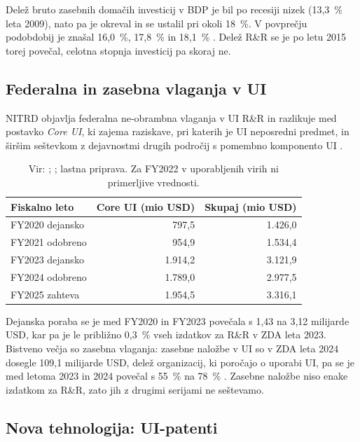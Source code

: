 \documentclass[12pt,a4paper]{article}
\begin{document}
Delež bruto zasebnih domačih investicij v BDP je bil po recesiji nizek (13,3~\% leta 2009), nato pa je okreval in se ustalil pri okoli 18~\%. V povprečju podobdobij je znašal 16,0~\%, 17,8~\% in 18,1~\% \parencite{fredinv}. Delež R\&R se je po letu 2015 torej povečal, celotna stopnja investicij pa skoraj ne.

\subsection{Federalna in zasebna vlaganja v UI}

NITRD objavlja federalna ne-obrambna vlaganja v UI R\&R in razlikuje med postavko \emph{Core UI}, ki zajema raziskave, pri katerih je UI neposredni predmet, in širšim seštevkom z dejavnostmi drugih področij s pomembno komponento UI \parencite{nitrd2025}.

\begin{table}[H]
\centering
\caption{Federalni ne-obrambni izdatki za UI R\&R}
\small
\begin{tabular}{lrr}
\toprule
\textbf{Fiskalno leto} & \textbf{Core UI (mio USD)} & \textbf{Skupaj (mio USD)} \\
\midrule
FY2020 dejansko & 797,5 & 1.426,0 \\
FY2021 odobreno & 954,9 & 1.534,4 \\
FY2023 dejansko & 1.914,2 & 3.121,9 \\
FY2024 odobreno & 1.789,0 & 2.977,5 \\
FY2025 zahteva & 1.954,5 & 3.316,1 \\
\bottomrule
\end{tabular}
\caption*{\footnotesize Vir: \cite{nitrd2021}; \cite{nitrd2025}; lastna priprava. Za FY2022 v uporabljenih virih ni primerljive vrednosti.}
\label{tab:UI-rd}
\end{table}

Dejanska poraba se je med FY2020 in FY2023 povečala s 1,43 na 3,12 milijarde USD, kar pa je le približno 0,3~\% vseh izdatkov za R\&R v ZDA leta 2023. Bistveno večja so zasebna vlaganja: zasebne naložbe v UI so v ZDA leta 2024 dosegle 109,1 milijarde USD, delež organizacij, ki poročajo o uporabi UI, pa se je med letoma 2023 in 2024 povečal s 55~\% na 78~\% \parencite{aiindex2025}. Zasebne naložbe niso enake izdatkom za R\&R, zato jih z drugimi serijami ne seštevamo.

\subsection{Nova tehnologija: UI-patenti}
\end{document}
